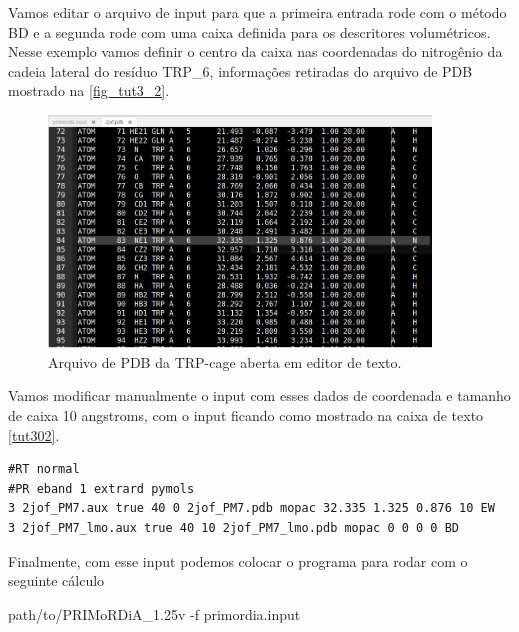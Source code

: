 \documentclass[a4paper,11pt]{refart}
\begin{document}
Vamos editar o arquivo de input para que a primeira entrada rode com o método BD e a segunda rode com uma caixa definida para os descritores volumétricos. Nesse exemplo vamos definir o centro da caixa nas coordenadas do nitrogênio da cadeia lateral do resíduo TRP\_6, informações retiradas do arquivo de PDB mostrado na \autoref{fig_tut3_2}.

\hspace*{-\leftmarginwidth}
\begin{minipage}{\fullwidth}
\begin{figure}[H]
\begin{center}
\includegraphics[width=4in]{images/tut3_img3}
\caption{Arquivo de PDB da TRP-cage aberta em editor de texto.}
\label{fig_tut3_2}
\end{center}
\end{figure}
\end{minipage}

Vamos modificar manualmente o input com esses dados de coordenada e tamanho de caixa 10 angstroms, com o input ficando como mostrado na caixa de texto \autoref{tut302}.

\hspace*{-1\leftmarginwidth}
\begin{minipage}{\fullwidth}
\begin{lstlisting}[caption={Input editado para execução do tutorial 3},label={tut302}]
#RT normal 
#PR eband 1 extrard pymols 
3 2jof_PM7.aux true 40 0 2jof_PM7.pdb mopac 32.335 1.325 0.876 10 EW 
3 2jof_PM7_lmo.aux true 40 10 2jof_PM7_lmo.pdb mopac 0 0 0 0 BD	
\end{lstlisting}
\end{minipage}

Finalmente, com esse input podemos colocar o programa para rodar com o seguinte cálculo

\hspace*{-\leftmarginwidth}
\begin{minipage}{\fullwidth}
\begin{commandshell}path/to/PRIMoRDiA_1.25v -f primordia.input\end{commandshell}
\end{minipage}
\end{document}
